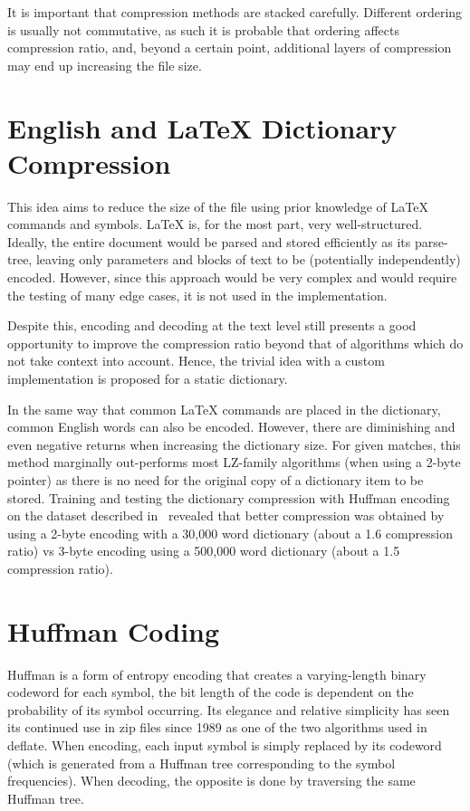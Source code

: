 \documentclass[11pt]{article}
\begin{document}
    It is important that compression methods are stacked carefully.
    Different ordering is usually not commutative, as such it is probable that ordering affects compression ratio, and, beyond a certain point, additional layers of compression may end up increasing the file size.


    \section{English and \LaTeX{} Dictionary Compression}\label{sec:application-level-encoding}
    This idea aims to reduce the size of the file using prior knowledge of \LaTeX{} commands and symbols.
    \LaTeX{} is, for the most part, very well-structured.
    Ideally, the entire document would be parsed and stored efficiently as its parse-tree, leaving only parameters and blocks of text to be (potentially independently) encoded.
    However, since this approach would be very complex and would require the testing of many edge cases, it is not used in the implementation.

    Despite this, encoding and decoding at the text level still presents a good opportunity to improve the compression ratio beyond that of algorithms which do not take context into account.
    Hence, the trivial idea with a custom implementation is proposed for a static dictionary.

    In the same way that common \LaTeX{} commands are placed in the dictionary, common English words can also be encoded.
    However, there are diminishing and even negative returns when increasing the dictionary size.
    For given matches, this method marginally out-performs most LZ-family algorithms (when using a 2-byte pointer) as there is no need for the original copy of a dictionary item to be stored.
    Training and testing the dictionary compression with Huffman encoding on the dataset described in~ revealed that better compression was obtained by using a 2-byte encoding with a 30,000 word dictionary (about a 1.6 compression ratio) vs 3-byte encoding using a 500,000 word dictionary (about a 1.5 compression ratio).


    \section{Huffman Coding}\label{sec:huffman-encoding}
    Huffman is a form of entropy encoding that creates a varying-length binary codeword for each symbol, the bit length of the code is dependent on the probability of its symbol occurring.
    Its elegance and relative simplicity has seen its continued use in zip files since 1989 as one of the two algorithms used in deflate.
    When encoding, each input symbol is simply replaced by its codeword (which is generated from a Huffman tree corresponding to the symbol frequencies).
    When decoding, the opposite is done by traversing the same Huffman tree.
\end{document}
